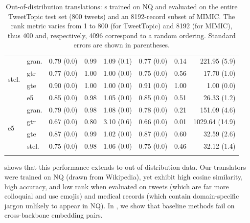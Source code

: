 \begin{table}[t]
\begin{tabular}{llrrr|rrr}
        \midrule
        \multirow{4}{*}{stel.} & gran. & 0.79 {\tiny (0.0)} & 0.99 & 1.09 {\tiny (0.1)} & 0.77 {\tiny (0.0)} & 0.14 & 221.95 {\tiny (5.9)} \\
        & gtr & 0.77 {\tiny (0.0)} & 1.00 & 1.00 {\tiny (0.0)} & 0.75 {\tiny (0.0)} & 0.56 & 17.70 {\tiny (1.0)} \\
        & gte & 0.90 {\tiny (0.0)} & 1.00 & 1.00 {\tiny (0.0)} & 0.91 {\tiny (0.0)} & 1.00 & 1.00 {\tiny (0.0)} \\
        & e5 & 0.85 {\tiny (0.0)} & 0.98 & 1.05 {\tiny (0.0)} & 0.85 {\tiny (0.0)} & 0.51 & 26.33 {\tiny (1.2)} \\
        \midrule
        \multirow{4}{*}{e5} & gran. & 0.79 {\tiny (0.0)} & 0.98 & 1.08 {\tiny (0.0)} & 0.78 {\tiny (0.0)} & 0.21 & 151.09 {\tiny (4.6)} \\
        & gtr & 0.67 {\tiny (0.0)} & 0.80 & 3.10 {\tiny (0.6)} & 0.66 {\tiny (0.0)} & 0.01 & 1029.64 {\tiny (14.9)} \\
        & gte & 0.87 {\tiny (0.0)} & 0.99 & 1.02 {\tiny (0.0)} & 0.87 {\tiny (0.0)} & 0.60 & 32.59 {\tiny (2.6)} \\
        & stel. & 0.75 {\tiny (0.0)} & 0.98 & 1.06 {\tiny (0.0)} & 0.75 {\tiny (0.0)} & 0.46 & 32.12 {\tiny (1.4)} \\
        \bottomrule\\[-1.6ex]
    \end{tabular}
    \caption{Out-of-distribution translations: \atk{}s trained on NQ and evaluated on the entire TweetTopic test set (800 tweets) and an 8192-record subset of MIMIC. The rank metric varies from 1 to 800 (for TweetTopic) and 8192 (for MIMIC), thus 400 and, respectively, 4096 correspond to a random ordering. Standard errors are shown in parentheses.}
    \label{tab:embeddings_ood}
\end{table}

 shows that this performance extends to out-of-distribution data.  Our \atk{} translators were trained on NQ (drawn from Wikipedia), yet exhibit high cosine similarity, high accuracy, and low rank when evaluated on tweets (which are far more colloquial and use emojis) and medical records (which contain domain-specific jargon unlikely to appear in NQ). In , we show that baseline methods fail on cross-backbone embedding pairs.


